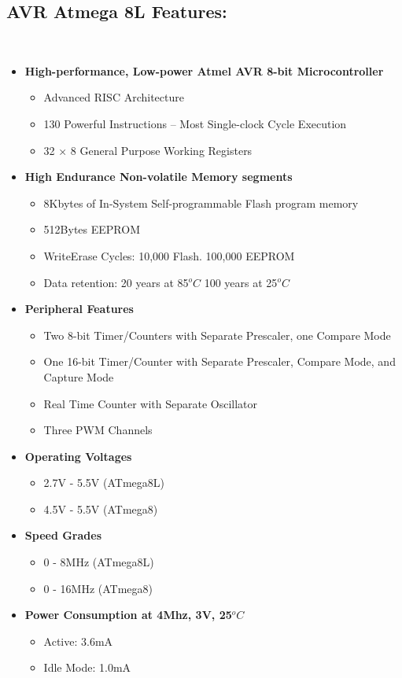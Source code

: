 \documentclass[12pt, a4paper]{article}
\begin{document}
\begin{appendices}
\section{AVR Atmega 8L Features:}
~\\
\begin{itemize}
\item \textbf{High-performance, Low-power Atmel AVR 8-bit Microcontroller}
\begin{itemize}
\item Advanced \ac{RISC} Architecture
\item 130 Powerful Instructions – Most Single-clock Cycle Execution
\item 32 × 8 General Purpose Working Registers
\end{itemize}
\item \textbf{High Endurance Non-volatile Memory segments}
\begin{itemize}
\item 8Kbytes of In-System Self-programmable Flash program memory
\item 512Bytes EEPROM
\item WriteErase Cycles: 10,000 Flash. 100,000 \ac{EEPROM}
\item Data retention: 20 years at 85$^oC$ 100 years at 25$^oC$
\end{itemize}
\item \textbf{Peripheral Features}
\begin{itemize}
\item Two 8-bit Timer/Counters with Separate Prescaler, one Compare Mode
\item One 16-bit Timer/Counter with Separate Prescaler, Compare Mode, and Capture Mode
\item Real Time Counter with Separate Oscillator
\item Three PWM Channels
\end{itemize}
\item \textbf{Operating Voltages}
\begin{itemize}
\item 2.7V - 5.5V (ATmega8L)
\item 4.5V - 5.5V (ATmega8)
\end{itemize}
\item \textbf{Speed Grades}
\begin{itemize}
\item 0 - 8MHz (ATmega8L)
\item 0 - 16MHz (ATmega8)
\end{itemize}
\item \textbf{Power Consumption at 4Mhz, 3V, 25$^oC$}
\begin{itemize}
\item Active: 3.6mA
\item Idle Mode: 1.0mA
\end{itemize}
\end{itemize}
\newpage


\end{appendices}
\end{document}
